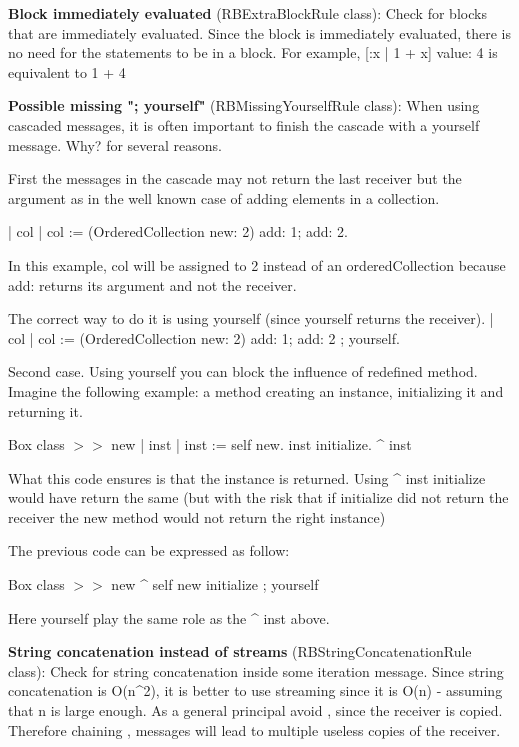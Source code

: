 \textbf{Block immediately evaluated} (RBExtraBlockRule class): Check for blocks that are immediately evaluated. Since the block is immediately evaluated, there is no need for the statements to be in a block.
For example, [:x | 1 + x] value: 4 is equivalent to 1 + 4

\textbf{Possible missing "; yourself"} (RBMissingYourselfRule class): When using cascaded messages, it is often important to finish the cascade with a yourself message. Why? for several reasons. 
	
	First the messages in the cascade may not return the last receiver but the argument as in the well known case of adding elements in a collection.
	
	| col  | 
	col := (OrderedCollection new: 2) add: 1; add: 2.
	
	In this example, col will be assigned to 2 instead of an orderedCollection because add: returns its argument and not the receiver. 
	
	The correct way to do it is using yourself (since yourself returns the receiver).
	| col  | 
	col := (OrderedCollection new: 2) add: 1; add: 2 ; yourself.
	
	
	Second case. Using yourself you can block the influence of redefined method. 
	Imagine the following example: a method creating an instance, initializing it and returning it.
	
	Box class $>>$ new
		| inst | 
		inst := self new.
		inst initialize. 
		^ inst
		
	What this code ensures is that the instance is returned. Using ^ inst initialize would have 
	return the same (but with the risk that if initialize did not return the receiver the new method would not return the right instance)
	
	The previous code can be expressed as follow:
	
	Box class $>>$ new
		^ self new initialize ; yourself 
		
	Here yourself play the same role as the ^ inst above. 
	
	

\textbf{String concatenation instead of streams} (RBStringConcatenationRule class): Check for string concatenation inside some iteration message. Since string concatenation is O(n^2), it is better to use streaming since it is O(n) - assuming that n is large enough. As a general principal avoid , since the receiver is copied. Therefore chaining , messages will lead to multiple useless copies of the receiver. 

